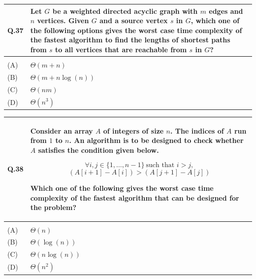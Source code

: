 \documentclass[14pt]{article}
\renewcommand{\arraystretch}{1.25}
\begin{document}
\renewcommand{\arraystretch}{1}

\vspace{0.3cm}

\renewcommand{\arraystretch}{1.25}

\begin{tabular}{|p{1.5cm}|p{12cm}|}
\hline

Q.37 &
\parbox[t]{\linewidth}{
\strut
Let $G$ be a weighted directed acyclic graph with $m$ edges and $n$
vertices. Given $G$ and a source vertex $s$ in $G$, which one of the
following options gives the worst case time complexity of the fastest
algorithm to find the lengths of shortest paths from $s$ to all vertices
that are reachable from $s$ in $G$?

\vspace{0.35cm}
}
\\
\hline
& \\[-0.2cm]
\hline

(A) & $\Theta(m+n)$ \\[0.25cm]
\hline

(B) & $\Theta(m+n\log(n))$ \\[0.25cm]
\hline

(C) & $\Theta(nm)$ \\[0.25cm]
\hline

(D) & $\Theta(n^3)$ \\[0.25cm]
\hline

\end{tabular}

\renewcommand{\arraystretch}{1}

\newpage

\vspace{0.3cm}

\renewcommand{\arraystretch}{1.25}

\begin{tabular}{|p{1.5cm}|p{12cm}|}
\hline

Q.38 &
\parbox[t]{\linewidth}{
\strut
Consider an array $A$ of integers of size $n$. The indices of $A$ run from
$1$ to $n$. An algorithm is to be designed to check whether $A$ satisfies
the condition given below.

\[
\forall i,j \in \{1,\ldots,n-1\}\ \text{such that } i>j,
\]
\[
(A[i+1]-A[i]) > (A[j+1]-A[j])
\]

Which one of the following gives the worst case time complexity of
the fastest algorithm that can be designed for the problem?

\vspace{0.35cm}
}
\\
\hline

& \\[-0.2cm]
\hline

(A) & $\Theta(n)$ \\[0.25cm]
\hline

(B) & $\Theta(\log(n))$ \\[0.25cm]
\hline

(C) & $\Theta(n\log(n))$ \\[0.25cm]
\hline

(D) & $\Theta(n^2)$ \\[0.25cm]
\hline

\end{tabular}
\end{document}
